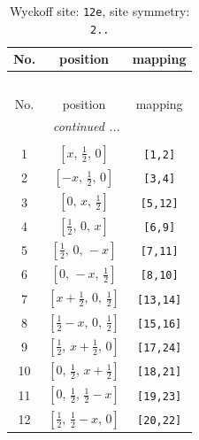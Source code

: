 \documentclass[fleqn,8pt]{jsarticle}
\begin{document}
\begin{longtable}{ccc}
\caption{Wyckoff site: {\tt 12e}, site symmetry: {\tt 2..}}
 \\
 \hline \hline
No. & position & mapping \\ \hline \endfirsthead

\multicolumn{2}{l}{\tablename\ \thetable{}} \\
 \hline \hline
No. & position & mapping \\ \hline \endhead

 \hline \hline
\multicolumn{2}{r}{\footnotesize\it continued ...} \\ \endfoot

 \hline \hline
\multicolumn{2}{r}{} \\ \endlastfoot

1 & $\left[ x,\, \frac{1}{2},\, 0 \right]$ & {\tt [1,2]} \\ \hline
2 & $\left[ - x,\, \frac{1}{2},\, 0 \right]$ & {\tt [3,4]} \\ \hline
3 & $\left[ 0,\, x,\, \frac{1}{2} \right]$ & {\tt [5,12]} \\ \hline
4 & $\left[ \frac{1}{2},\, 0,\, x \right]$ & {\tt [6,9]} \\ \hline
5 & $\left[ \frac{1}{2},\, 0,\, - x \right]$ & {\tt [7,11]} \\ \hline
6 & $\left[ 0,\, - x,\, \frac{1}{2} \right]$ & {\tt [8,10]} \\ \hline
7 & $\left[ x + \frac{1}{2},\, 0,\, \frac{1}{2} \right]$ & {\tt [13,14]} \\ \hline
8 & $\left[ \frac{1}{2} - x,\, 0,\, \frac{1}{2} \right]$ & {\tt [15,16]} \\ \hline
9 & $\left[ \frac{1}{2},\, x + \frac{1}{2},\, 0 \right]$ & {\tt [17,24]} \\ \hline
10 & $\left[ 0,\, \frac{1}{2},\, x + \frac{1}{2} \right]$ & {\tt [18,21]} \\ \hline
11 & $\left[ 0,\, \frac{1}{2},\, \frac{1}{2} - x \right]$ & {\tt [19,23]} \\ \hline
12 & $\left[ \frac{1}{2},\, \frac{1}{2} - x,\, 0 \right]$ & {\tt [20,22]} \\
\end{longtable}
\renewcommand{\arraystretch}{1.2}
\end{document}
